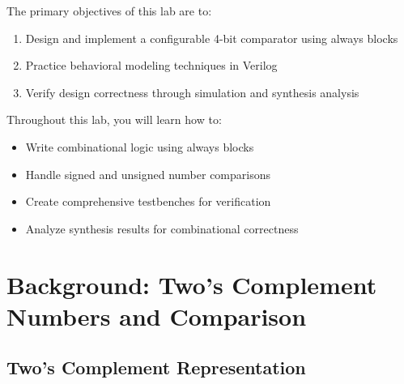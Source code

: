 \documentclass[12pt]{labmanual}
\begin{document}
The primary objectives of this lab are to:
\begin{enumerate}
    \item Design and implement a configurable 4-bit comparator using always blocks
    \item Practice behavioral modeling techniques in Verilog
    \item Verify design correctness through simulation and synthesis analysis
\end{enumerate}

Throughout this lab, you will learn how to:
\begin{itemize}
    \item Write combinational logic using always blocks
    \item Handle signed and unsigned number comparisons
    \item Create comprehensive testbenches for verification
    \item Analyze synthesis results for combinational correctness
\end{itemize}

\section{Background: Two's Complement Numbers and Comparison}

\subsection{Two's Complement Representation}
\end{document}
